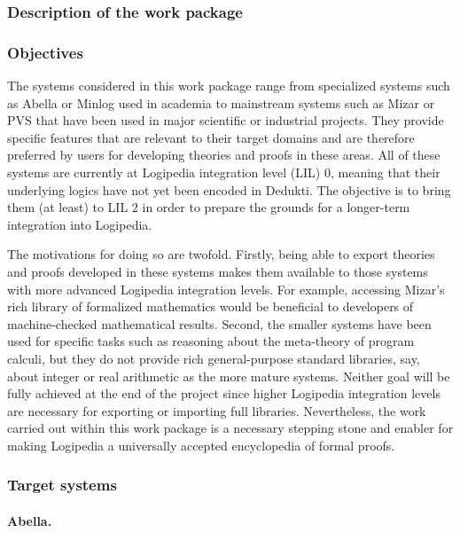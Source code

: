 \subsubsection{Description of the work package }

\subsubsection*{Objectives}

The systems considered in this work package range from specialized systems such
as Abella or Minlog used in academia to mainstream systems such as Mizar or PVS
that have been used in major scientific or industrial projects. They provide
specific features that are relevant to their target domains and are therefore
preferred by users for developing theories and proofs in these areas. All of
these systems are currently at Logipedia integration level (LIL) $0$, meaning
that their underlying logics have not yet been encoded in Dedukti. The objective
is to bring them (at least) to LIL $2$ in order to prepare the grounds for a
longer-term integration into Logipedia.

The motivations for doing so are twofold. Firstly, being able to export theories
and proofs developed in these systems makes them available to those systems with
more advanced Logipedia integration levels. For example, accessing Mizar's rich
library of formalized mathematics would be beneficial to developers of
machine-checked mathematical results. Second, the smaller systems have been used
for specific tasks such as reasoning about the meta-theory of program calculi,
but they do not provide rich general-purpose standard libraries, say, about
integer or real arithmetic as the more mature systems. Neither goal will be
fully achieved at the end of the project since higher Logipedia integration
levels are necessary for exporting or importing full libraries. Nevertheless,
the work carried out within this work package is a necessary stepping stone and
enabler for making Logipedia a universally accepted encyclopedia of formal
proofs.

\subsubsection*{Target systems}

\paragraph*{Abella.}

